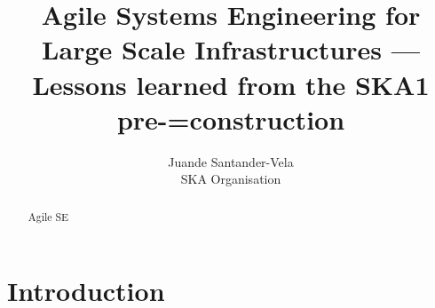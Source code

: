 \documentclass[a4paper,12pt,twoside]{elsarticle}
\begin{document}
\title{Agile Systems Engineering for Large Scale Infrastructures — Lessons learned from the SKA1 pre-=construction}

\author{
Juande Santander-Vela \\
SKA Organisation
}

\maketitle

\begin{abstract}
Agile SE
\end{abstract}


\section{Introduction} %
\label{sec:introduction}

\end{document}
